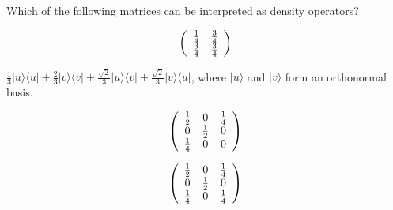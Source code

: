 \documentclass[a4paper,10pt,landscape,twocolumn]{scrartcl}
\newcommand{\ket}[1]{| #1 \rangle}
\newcommand{\bra}[1]{\langle #1 |}
\begin{document}
\begin{exercise}
Which of the following matrices can be interpreted as density operators?
\begin{subex}
\[
\left(
\begin{array}{c c}
\frac{1}{4}& \frac{3}{4}\\
\frac{3}{4}& \frac{3}{4}
\end{array}
\right)
\]
\end{subex}
\begin{subex}
$\frac{1}{3}\ket{u}\bra{u} + \frac{2}{3}\ket{v}\bra{v} + \frac{\sqrt{2}}{3}\ket{u}\bra{v} + \frac{\sqrt{2}}{3}\ket{v}\bra{u}$, where $\ket{u}$ and $\ket{v}$ form an orthonormal basis.
\end{subex}
\begin{subex}
\[
\left(
\begin{array}{c c c}
\frac{1}{2}& 0 & \frac{1}{4}\\
0 & \frac{1}{2} & 0\\
\frac{1}{4} & 0 & 0\\
\end{array}
\right)
\]
\end{subex}
\begin{subex}
\[
\left(
\begin{array}{c c c}
\frac{1}{2}& 0 & \frac{1}{4}\\
0 & \frac{1}{2} & 0\\
\frac{1}{4} & 0 & \frac{1}{4}\\
\end{array}
\right)
\]
\end{subex}
\end{exercise}
\end{document}
